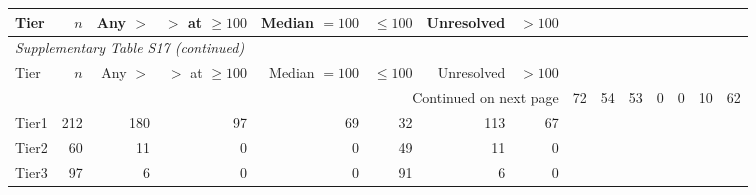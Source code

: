 \begingroup\footnotesize\setlength{\tabcolsep}{4pt}

\begin{longtable}{lrrrrrrr}

\toprule Tier & $n$ & Any $>$ & $>$ at $\geq100$ & Median $=100$ & $\leq100$ & Unresolved & $>100$ \\ \midrule\endfirsthead

\multicolumn{8}{l}{\textit{Supplementary Table S17 (continued)}} \\

\toprule Tier & $n$ & Any $>$ & $>$ at $\geq100$ & Median $=100$ & $\leq100$ & Unresolved & $>100$ \\ \midrule\endhead

\midrule\multicolumn{8}{r}{Continued on next page}\endfoot\bottomrule\endlastfoot

Tier0 & 72 & 54 & 53 & 0 & 0 & 10 & 62 \\
Tier1 & 212 & 180 & 97 & 69 & 32 & 113 & 67 \\
Tier2 & 60 & 11 & 0 & 0 & 49 & 11 & 0 \\
Tier3 & 97 & 6 & 0 & 0 & 91 & 6 & 0 \\

\end{longtable}\endgroup
